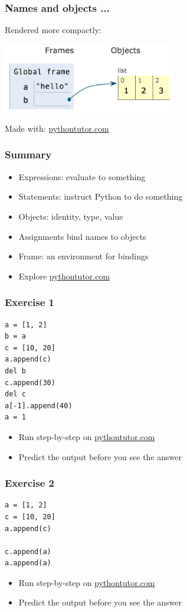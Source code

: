 \documentclass[14pt,compress]{beamer}
\begin{document}
\begin{frame}[fragile]
  \frametitle{Names and objects ...}
  Rendered more compactly:
  \vspace*{0.25in}
  \begin{center}
    \includegraphics[width=3in]{data/a_str_b_list_compact.png}
  \end{center}
  \vspace*{0.5in}
  {\small Made with: \url{pythontutor.com}}
\end{frame}

\begin{frame}
  \frametitle{Summary}
  \begin{itemize}
  \item Expressions: evaluate to something
  \item Statements: instruct Python to do something
  \item Objects: identity, type, value
  \item Assignments bind names to objects
  \item Frame: an environment for bindings
  \item Explore \url{pythontutor.com}
  \end{itemize}
\end{frame}

\begin{frame}[fragile]
  \frametitle{Exercise 1}
\begin{lstlisting}
a = [1, 2]
b = a
c = [10, 20]
a.append(c)
del b
c.append(30)
del c
a[-1].append(40)
a = 1
\end{lstlisting}
\vspace*{0.1in}
  \begin{itemize}
  \item Run step-by-step on \url{pythontutor.com}
  \item Predict the output before you see the answer
  \end{itemize}
\end{frame}

\begin{frame}[fragile]
  \frametitle{Exercise 2}
\begin{lstlisting}
a = [1, 2]
c = [10, 20]
a.append(c)

c.append(a)
a.append(a)
\end{lstlisting}
\vspace*{0.1in}

  \begin{itemize}
  \item Run step-by-step on \url{pythontutor.com}
  \item Predict the output before you see the answer
  \end{itemize}
\end{frame}
\end{document}
